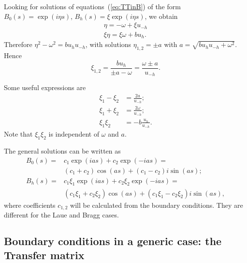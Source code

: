 \documentclass[preprint]{iucr}              %
\begin{document}
Looking for solutions of equations~(\ref{eq:TTinB}) of the form $B_0(s)=\exp(i \eta s)$, $B_h(s)=\xi \exp(i \eta s)$,  we obtain
\begin{equation}
    \begin{split}
        \eta =-\omega + \xi u_{-h} \\
         \xi \eta=\xi \omega+b u_h.
    \end{split}
\end{equation}
Therefore $\eta^2-\omega^2=b u_h u_{-h}$,
with solutions $\eta_{1,2}=\pm a$  with $\boxed{a=\sqrt{b u_h u_{-h}+\omega^2}}$.
Hence
\begin{equation}\label{eq:xis}
\xi_{1,2}=\frac{b u_h}{\pm a-\omega} = \frac{\omega \pm a}{u_{-h}}.    
\end{equation}

Some useful expressions are
\begin{subequations}
\label{eq:TTuseful}
\begin{align}
\xi_1-\xi_2 &= \frac{2 a}{u_{-h}};\\
\xi_1+\xi_2 &= \frac{2 \omega}{u_{-h}};\\
\xi_1 \xi_2 &= -b \frac{u_h}{u_{-h}}.
\end{align}
\end{subequations}
Note that $\xi_1\xi_2$ is independent of $\omega$ and $a$.

The general solutions can be written as 
\begin{subequations}
\label{eq:BSolutions}
\begin{align}
B_0(s) = &c_1 \exp(i a s) + c_2 \exp(-i a s) = \nonumber\\ &(c_1+c_2) \cos(as) + (c_1-c_2) i \sin(as); \\
B_h(s) = &c_1 \xi_1 \exp(i a s) + c_2 \xi_2 \exp(-i a s) = \nonumber \\
&(c_1 \xi_1+c_2 \xi_2) \cos(as) + (c_1 \xi_1-c_2 \xi_2) i \sin(as),
\end{align}
\end{subequations}
where coefficients $c_{1,2}$ will be calculated from the boundary conditions. They are different for the Laue and Bragg cases.

\subsection{Boundary conditions in a generic case: the Transfer matrix}
\label{sec:transferMatrix}
\end{document}
